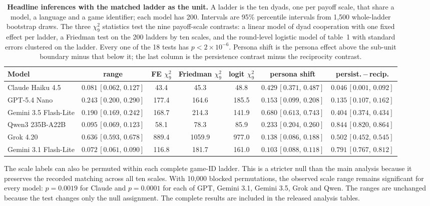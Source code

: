 \documentclass[11pt,a4paper]{article}
\newif\ifhighlightrevisions
\newcommand{\rev}[1]{{\color{red}#1}}
\newcommand{\rev}[1]{#1}
\begin{document}
\begin{table}[htbp]
\ifhighlightrevisions\color{red}\fi
\centering
\footnotesize
\setlength{\tabcolsep}{2pt}
\caption{\rev{\textbf{Headline inferences with the matched ladder as the unit.} A ladder is the ten dyads, one per payoff scale, that share a model, a language and a game identifier; each model has 200. Intervals are 95\% percentile intervals from 1{,}500 whole-ladder bootstrap draws. The three $\chi^2_9$ statistics test the nine payoff-scale contrasts: a linear model of dyad cooperation with one fixed effect per ladder, a Friedman test on the 200 ladders by ten scales, and the round-level logistic model of table~1 with standard errors clustered on the ladder. Every one of the 18 tests has $p < 2\times10^{-6}$. Persona shift is the persona effect above the sub-unit boundary minus that below it; the last column is the persistence contrast minus the reciprocity contrast.}}
\label{tab:D-ladder}
\begin{tabular}{@{}lcccccc@{}}
\toprule
Model & range & FE $\chi^2_9$ & Friedman $\chi^2_9$ & logit $\chi^2_9$ & persona shift & persist.\,$-$\,recip. \\
\midrule
Claude Haiku 4.5 & $0.081\,[0.062,\,0.127]$ & 43.4 & 45.3 & 48.8 & $0.429\,[0.371,\,0.487]$ & $0.046\,[0.001,\,0.092]$ \\
GPT-5.4 Nano & $0.243\,[0.200,\,0.290]$ & 177.4 & 164.6 & 185.5 & $0.153\,[0.099,\,0.208]$ & $0.135\,[0.107,\,0.162]$ \\
Gemini 3.5 Flash-Lite & $0.190\,[0.169,\,0.242]$ & 168.7 & 214.3 & 141.9 & $0.680\,[0.613,\,0.743]$ & $0.404\,[0.374,\,0.434]$ \\
Qwen3 235B-A22B & $0.095\,[0.069,\,0.123]$ & 58.1 & 78.3 & 85.9 & $0.233\,[0.204,\,0.260]$ & $0.844\,[0.820,\,0.864]$ \\
Grok 4.20 & $0.636\,[0.593,\,0.678]$ & 889.4 & 1059.9 & 977.0 & $0.138\,[0.086,\,0.188]$ & $0.502\,[0.452,\,0.545]$ \\
Gemini 3.1 Flash-Lite & $0.072\,[0.061,\,0.090]$ & 116.8 & 181.7 & 161.0 & $0.103\,[0.088,\,0.118]$ & $0.791\,[0.767,\,0.812]$ \\
\bottomrule
\end{tabular}
\end{table}


The scale labels can also be permuted within each complete game-ID ladder. This is a stricter null than the main analysis because it preserves the recorded matching across all ten scales. With 10,000 blocked permutations, the observed scale range remains significant for every model: $p=0.0019$ for Claude and $p=0.0001$ for each of GPT, Gemini 3.1, Gemini 3.5, Grok and Qwen. The ranges are unchanged because the test changes only the null assignment. The complete results are included in the released analysis tables.
\end{document}
